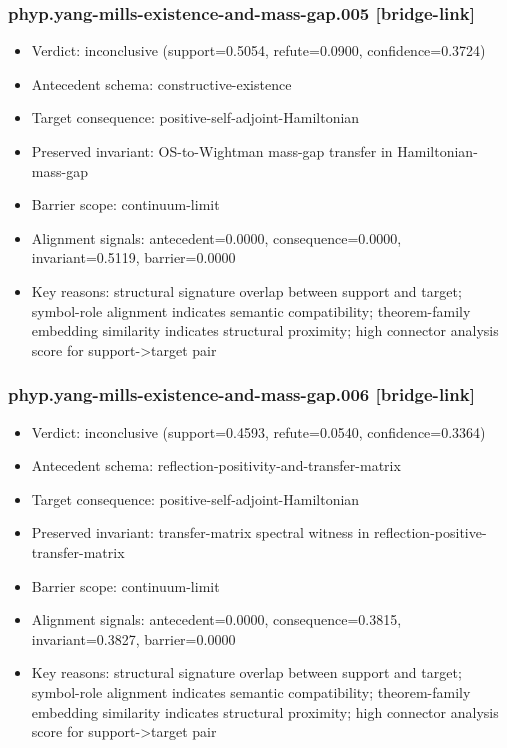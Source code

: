 \documentclass[
]{article}
\providecommand{\tightlist}{%
  \setlength{\itemsep}{0pt}\setlength{\parskip}{0pt}}
\begin{document}
\subsubsection{phyp.yang-mills-existence-and-mass-gap.005
{[}bridge-link{]}}\label{phypyang-mills-existence-and-mass-gap005-bridge-link}

\begin{itemize}
\tightlist
\item
  Verdict: inconclusive (support=0.5054, refute=0.0900,
  confidence=0.3724)
\item
  Antecedent schema: constructive-existence
\item
  Target consequence: positive-self-adjoint-Hamiltonian
\item
  Preserved invariant: OS-to-Wightman mass-gap transfer in
  Hamiltonian-mass-gap
\item
  Barrier scope: continuum-limit
\item
  Alignment signals: antecedent=0.0000, consequence=0.0000,
  invariant=0.5119, barrier=0.0000
\item
  Key reasons: structural signature overlap between support and target;
  symbol-role alignment indicates semantic compatibility; theorem-family
  embedding similarity indicates structural proximity; high connector
  analysis score for support-\textgreater target pair
\end{itemize}

\subsubsection{phyp.yang-mills-existence-and-mass-gap.006
{[}bridge-link{]}}\label{phypyang-mills-existence-and-mass-gap006-bridge-link}

\begin{itemize}
\tightlist
\item
  Verdict: inconclusive (support=0.4593, refute=0.0540,
  confidence=0.3364)
\item
  Antecedent schema: reflection-positivity-and-transfer-matrix
\item
  Target consequence: positive-self-adjoint-Hamiltonian
\item
  Preserved invariant: transfer-matrix spectral witness in
  reflection-positive-transfer-matrix
\item
  Barrier scope: continuum-limit
\item
  Alignment signals: antecedent=0.0000, consequence=0.3815,
  invariant=0.3827, barrier=0.0000
\item
  Key reasons: structural signature overlap between support and target;
  symbol-role alignment indicates semantic compatibility; theorem-family
  embedding similarity indicates structural proximity; high connector
  analysis score for support-\textgreater target pair
\end{itemize}
\end{document}
